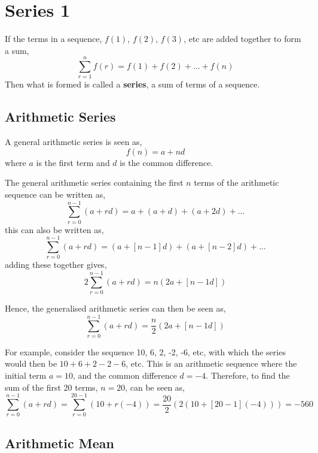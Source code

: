 \section{Series 1}

    If the terms in a sequence, \(f(1)\), \(f(2)\), \(f(3)\), etc are added together to form a sum,
    \begin{equation}
        \sum_{r=1}^n f(r) = f(1) + f(2) + ... + f(n)
    \end{equation}
    Then what is formed is called a \textbf{series}, a sum of terms of a sequence.

    \subsection{Arithmetic Series}
        
        A general arithmetic series is seen as,
        \begin{equation}
            f(n) = a + nd
        \end{equation}
        where \(a\) is the first term and \(d\) is the common difference.

        \par \hfill \break
        The general arithmetic series containing the first \(n\) terms of the arithmetic sequence can be written as,
        \begin{equation}
            \sum_{r=0}^{n-1} (a + rd) = a + (a +d) + (a + 2d) + ...
        \end{equation}
        this can also be written as,
        \begin{equation}
            \sum_{r=0}^{n-1} (a + rd) = (a + [n-1]d) + (a + [n-2]d) + ...
        \end{equation}
        adding these together gives,
        \begin{equation}
            2 \sum_{r=0}^{n-1} (a + rd) = n(2a + [n-1d])
        \end{equation}
        
        \par \hfill \break
        Hence, the generalised arithmetic series can then be seen as,
        \begin{equation}
            \sum_{r=0}^{n-1} (a + rd) = \frac{n}{2}(2a + [n-1d])
        \end{equation}

        \par \hfill \break
        For example, consider the sequence 10, 6, 2, -2, -6, etc, with which the series would then be \(10+6+2-2-6\), 
        etc. This is an arithmetic sequence where the initial term \(a=10\), and the common difference \(d=-4\).  
        Therefore, to find the sum of the first 20 terms, \(n=20\), can be seen as,
        \begin{equation}
            \sum_{r=0}^{n-1} (a + rd) = \sum_{r=0}^{20-1} (10 + r(-4)) = \frac{20}{2}(2(10+[20-1](-4))) = -560 
        \end{equation}

    \subsection{Arithmetic Mean}